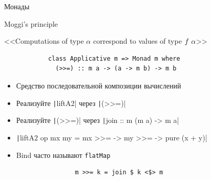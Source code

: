     \begin{frame}[fragile]{Монады}
        \begin{block}{Moggi's principle}
            \begin{center}
                <<Computations of type $\alpha$ correspond to values of type $f~\alpha$>>
            \end{center}
        \end{block}
        \vspace{0.5em}
        \begin{verbatim}
            class Applicative m => Monad m where
              (>>=) :: m a -> (a -> m b) -> m b
        \end{verbatim}
        \begin{itemize}
            \item Средство последовательной композиции вычислений
            \item[\todo] Реализуйте \texttt|liftA2| через \texttt|(>>=)|
            \item[\todo] Реализуйте \texttt|(>>=)| через \texttt|join :: m (m a) -> m a|
            \item[\answer] \pause \texttt|liftA2 op mx my = mx >>= \x -> my >>= \y -> pure (x + y)|
            \item[\answer] \pause Bind часто называют \texttt{flatMap}
            \begin{verbatim}
                m >>= k = join $ k <$> m
            \end{verbatim}
        \end{itemize}
    \end{frame}

